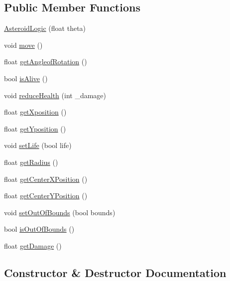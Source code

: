 \subsection*{Public Member Functions}
\begin{DoxyCompactItemize}
\item 
\hyperlink{class_asteroid_logic_af566df9981ce525a41f7ce42e49e64b0}{Asteroid\+Logic} (float theta)
\item 
void \hyperlink{class_asteroid_logic_af20b202c4f5857279192733a0b2fdbd3}{move} ()
\item 
float \hyperlink{class_asteroid_logic_a2087d2a3b9bf9e6f1367833454b2fb97}{get\+Angleof\+Rotation} ()
\item 
bool \hyperlink{class_asteroid_logic_a18e01f832db4f109799fc01c8c15efcd}{is\+Alive} ()
\item 
void \hyperlink{class_asteroid_logic_a54519e4b2719c70d17f5a28bb0d8fb56}{reduce\+Health} (int \+\_\+damage)
\item 
float \hyperlink{class_asteroid_logic_a1d79a614c5e1a9409404f6a2def25761}{get\+Xposition} ()
\item 
float \hyperlink{class_asteroid_logic_a83863c5262a29b2999d04ad443622bbc}{get\+Yposition} ()
\item 
void \hyperlink{class_asteroid_logic_a594dc710574cac901e9999474b9379fe}{set\+Life} (bool life)
\item 
float \hyperlink{class_asteroid_logic_a575d9f801770906960b65dafe937fba5}{get\+Radius} ()
\item 
float \hyperlink{class_asteroid_logic_a4bff0373a2cefe48c984b469ddbcb52d}{get\+Center\+X\+Position} ()
\item 
float \hyperlink{class_asteroid_logic_a00c9cda893b9dee7e2225377dd54a2eb}{get\+Center\+Y\+Position} ()
\item 
void \hyperlink{class_asteroid_logic_ac9bfa7e9a3eed670f9264f15f395894e}{set\+Out\+Of\+Bounds} (bool bounds)
\item 
bool \hyperlink{class_asteroid_logic_ad2fadce802b18aa2d57baee65a56833e}{is\+Out\+Of\+Bounds} ()
\item 
float \hyperlink{class_asteroid_logic_abe3018168bb1a91b78aac410a3cb7853}{get\+Damage} ()
\end{DoxyCompactItemize}


\subsection{Constructor \& Destructor Documentation}
\mbox{\label{class_asteroid_logic_af566df9981ce525a41f7ce42e49e64b0}} 
